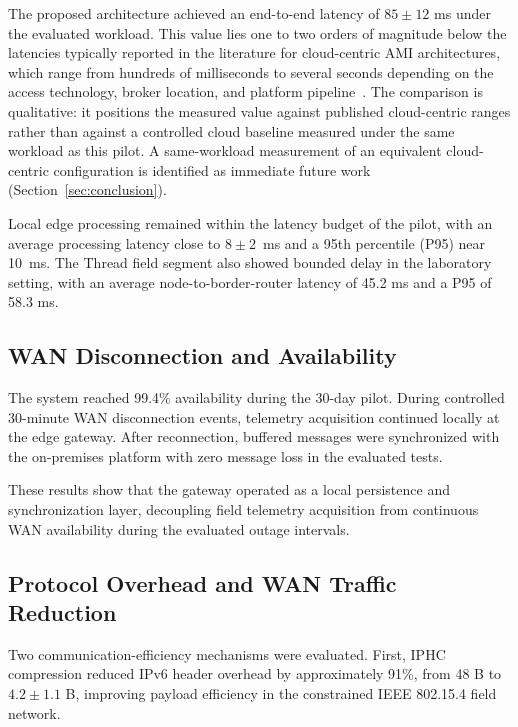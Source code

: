 \documentclass[conference]{IEEEtran}
\begin{document}
The proposed architecture achieved an end-to-end latency of $85 \pm 12$ ms under the evaluated workload. This value lies one to two orders of magnitude below the latencies typically reported in the literature for cloud-centric AMI architectures, which range from hundreds of milliseconds to several seconds depending on the access technology, broker location, and platform pipeline~\cite{minhEdgeComputingIoTEnabled2022,alsafranChallengesImplementingIoT2025,abdulsalamOverviewRecentWireless2024}. The comparison is qualitative: it positions the measured value against published cloud-centric ranges rather than against a controlled cloud baseline measured under the same workload as this pilot. A same-workload measurement of an equivalent cloud-centric configuration is identified as immediate future work (Section~\ref{sec:conclusion}).

Local edge processing remained within the latency budget of the pilot, with an average processing latency close to $8 \pm 2$~ms and a 95th percentile (P95) near 10~ms. The Thread field segment also showed bounded delay in the laboratory setting, with an average node-to-border-router latency of 45.2 ms and a P95 of 58.3 ms.

\subsection{WAN Disconnection and Availability}
\label{subsec:results_availability}

The system reached 99.4\% availability during the 30-day pilot. During controlled 30-minute WAN disconnection events, telemetry acquisition continued locally at the edge gateway. After reconnection, buffered messages were synchronized with the on-premises platform with zero message loss in the evaluated tests.

These results show that the gateway operated as a local persistence and synchronization layer, decoupling field telemetry acquisition from continuous WAN availability during the evaluated outage intervals.

\subsection{Protocol Overhead and WAN Traffic Reduction}
\label{subsec:results_overhead}

Two communication-efficiency mechanisms were evaluated. First, IPHC compression reduced IPv6 header overhead by approximately 91\%, from 48 B to $4.2 \pm 1.1$ B, improving payload efficiency in the constrained IEEE 802.15.4 field network.
\end{document}
